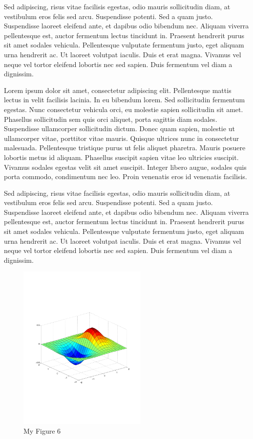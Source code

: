 Sed adipiscing, risus vitae facilisis egestas, odio mauris sollicitudin diam, at vestibulum eros felis sed arcu. Suspendisse potenti. Sed a quam justo. Suspendisse laoreet eleifend ante, et dapibus odio bibendum nec. Aliquam viverra pellentesque est, auctor fermentum lectus tincidunt in. Praesent hendrerit purus sit amet sodales vehicula. Pellentesque vulputate fermentum justo, eget aliquam urna hendrerit ac. Ut laoreet volutpat iaculis. Duis et erat magna. Vivamus vel neque vel tortor eleifend lobortis nec sed sapien. Duis fermentum vel diam a dignissim. 

Lorem ipsum dolor sit amet, consectetur adipiscing elit. Pellentesque mattis lectus in velit facilisis lacinia. In eu bibendum lorem. Sed sollicitudin fermentum egestas. Nunc consectetur vehicula orci, eu molestie sapien sollicitudin sit amet. Phasellus sollicitudin sem quis orci aliquet, porta sagittis diam sodales. Suspendisse ullamcorper sollicitudin dictum. Donec quam sapien, molestie ut ullamcorper vitae, porttitor vitae mauris. Quisque ultrices nunc in consectetur malesuada. Pellentesque tristique purus ut felis aliquet pharetra. Mauris posuere lobortis metus id aliquam. Phasellus suscipit sapien vitae leo ultricies suscipit. Vivamus sodales egestas velit sit amet suscipit. Integer libero augue, sodales quis porta commodo, condimentum nec leo. Proin venenatis eros id venenatis facilisis.

Sed adipiscing, risus vitae facilisis egestas, odio mauris sollicitudin diam, at vestibulum eros felis sed arcu. Suspendisse potenti. Sed a quam justo. Suspendisse laoreet eleifend ante, et dapibus odio bibendum nec. Aliquam viverra pellentesque est, auctor fermentum lectus tincidunt in. Praesent hendrerit purus sit amet sodales vehicula. Pellentesque vulputate fermentum justo, eget aliquam urna hendrerit ac. Ut laoreet volutpat iaculis. Duis et erat magna. Vivamus vel neque vel tortor eleifend lobortis nec sed sapien. Duis fermentum vel diam a dignissim. 

\begin{figure}[h!]
	\begin{center}
		\includegraphics[width=2.5in]{./images/sample.pdf}
		\caption{My Figure 6}
		\label{fig:MyFigure6}
	\end{center}
\end{figure}


